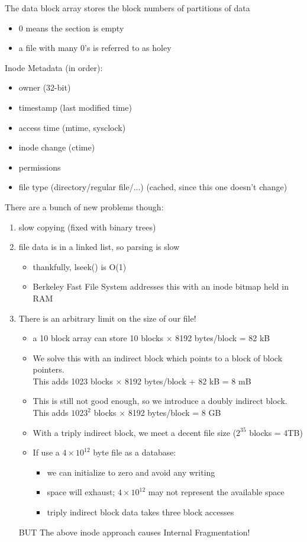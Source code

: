 \documentclass[../../lecture_notes.tex]{subfiles}
\begin{document}
The data block array stores the block numbers of partitions of data
	\begin{itemize}
		\item 0 means the section is empty
		\item a file with many 0’s is referred to as holey
	\end{itemize}
Inode Metadata (in order):
	\begin{itemize}
		\item owner (32-bit)
		\item timestamp (last modified time)
		\item access time (mtime, sysclock)
		\item inode change (ctime)
		\item permissions
		\item file type (directory/regular file/...) (cached, since this one doesn’t change)
	\end{itemize}


There are a bunch of new problems though:
\begin{enumerate}
\item slow copying (fixed with binary trees)
\item file data is in a linked list, so parsing is slow
	\begin{itemize}
		\item thankfully, lseek() is O(1)
		\item Berkeley Fast File System addresses this with an inode bitmap held in RAM
	\end{itemize}
\item There is an arbitrary limit on the size of our file!
	\begin{itemize}
	\item a 10 block array can store 10 blocks $\times$ 8192 bytes/block = 82 kB
	\item We solve this with an indirect block which points to a block of block pointers. \\
		This adds 1023 blocks $\times$ 8192 bytes/block + 82 kB = 8 mB
	\item This is still not good enough, so we introduce a doubly indirect block. \\
		This adds $1023^2$ blocks $\times$ 8192 bytes/block = 8 GB 
	\item With a triply indirect block, we meet a decent file size ($2^{35}$ blocks = 4TB)
	\item If use a $4\times10^{12}$ byte file as a database:
		\begin{itemize}
			\item we can initialize to zero and avoid any writing
			\item space will exhaust; $4\times10^{12}$ may not represent the available space
			\item triply indirect block data takes three block accesses
		\end{itemize}
	\end{itemize}
	BUT The above inode approach causes Internal Fragmentation!
\end{enumerate}
\end{document}
